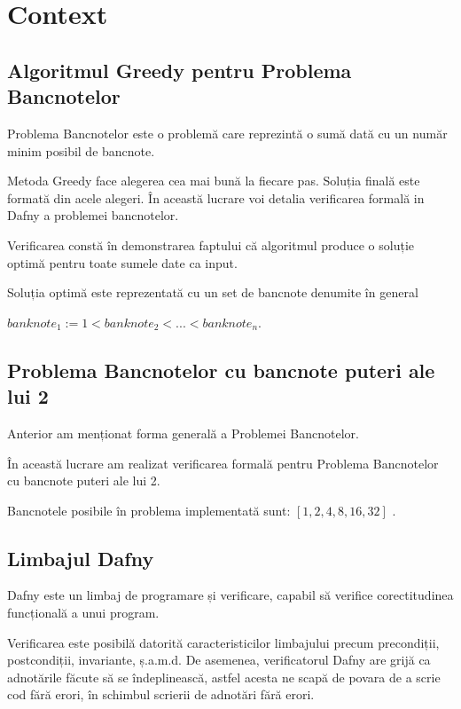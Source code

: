 


\chapter{Context} 

\section{Algoritmul Greedy pentru Problema Bancnotelor} 
Problema Bancnotelor este o problemă care reprezintă o sumă dată cu un număr minim posibil de bancnote.\par
Metoda Greedy face alegerea cea mai bună la fiecare pas. Soluția finală este formată din acele alegeri.
În această lucrare voi detalia verificarea formală in Dafny a problemei bancnotelor.\par
Verificarea constă în demonstrarea faptului că algoritmul produce o soluție optimă pentru toate 
sumele date ca input. \par
Soluția optimă este reprezentată cu un set de bancnote denumite în general

$ banknote_{1}:= 1 < banknote_{2} < ... < banknote_{n} $. 


\section{Problema Bancnotelor cu bancnote puteri ale lui 2}
Anterior am menționat forma generală a Problemei Bancnotelor.\par
În această lucrare am realizat verificarea formală pentru Problema Bancnotelor cu bancnote puteri ale lui 2.\par
Bancnotele posibile în problema implementată sunt: 
$[1, 2, 4, 8, 16, 32]$ . 

\section{Limbajul Dafny} 
Dafny este un limbaj de programare și verificare, capabil să verifice corectitudinea
 funcțională a unui program.\par
Verificarea este posibilă datorită caracteristicilor limbajului precum precondiții, postcondiții, 
invariante, ș.a.m.d. De asemenea, verificatorul Dafny are grijă ca adnotările făcute să se îndeplinească,
astfel acesta ne scapă de povara de a scrie cod fără erori, în schimbul scrierii de adnotări fără erori.